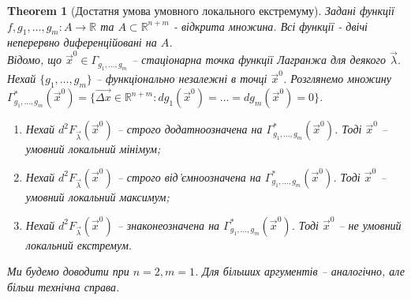 \documentclass[a4paper, 10pt]{article}
\theoremstyle{theoremdd}
\newtheorem{theorem}{Theorem}[subsection]
\theoremstyle{theoremdd}
\theoremstyle{theoremdd}
\theoremstyle{theoremdd}
\theoremstyle{theoremdd}
\theoremstyle{theoremdd}
\theoremstyle{theoremdd}
\theoremstyle{theoremdd}
\theoremstyle{theoremdd}
\begin{document}
\begin{theorem}[Достатня умова умовного локального екстремуму]
Задані функції $f,g_1,\dots,g_m\colon A \to \mathbb{R}$ та $A \subset \mathbb{R}^{n+m}$ - відкрита множина. Всі функції - двічі неперервно диференційовані на $A$.\\
Відомо, що $\vec{x}^0 \in \Gamma_{g_1,\dots,g_m}$ -- стаціонарна точка функції Лагранжа для деякого $\vec{\lambda}$. Нехай $\{g_1,\dots,g_m\}$ -- функціонально незалежні в точці $\vec{x}^0$. Розглянемо множину $\Gamma^*_{g_1,\dots,g_m}(\vec{x}^0) = \{ \vec{\Delta x} \in \mathbb{R}^{n+m}: dg_1(\vec{x}^0) = \dots = dg_m(\vec{x}^0) = 0 \}$.
\begin{enumerate}[nosep,wide=0pt,label={\arabic*)}]
\item Нехай $d^2 F_{\vec{\lambda}}(\vec{x}^0)$ -- строго додатноозначена на $\Gamma^*_{g_1,\dots,g_m}(\vec{x}^0)$. Тоді $\vec{x}^0$ -- умовний локальний мінімум;
\item Нехай $d^2 F_{\vec{\lambda}}(\vec{x}^0)$ -- строго від'ємноозначена на $\Gamma^*_{g_1,\dots,g_m}(\vec{x}^0)$. Тоді $\vec{x}^0$ -- умовний локальний максимум;
\item Нехай $d^2 F_{\vec{\lambda}}(\vec{x}^0)$ -- знаконеозначена на $\Gamma^*_{g_1,\dots,g_m}(\vec{x}^0)$. Тоді $\vec{x}^0$ -- не умовний локальний екстремум.
\end{enumerate}
\end{theorem}

\textit{Ми будемо доводити при $n = 2, m = 1$. Для більших аргументів -- аналогічно, але більш технічна справа.}
\end{document}
